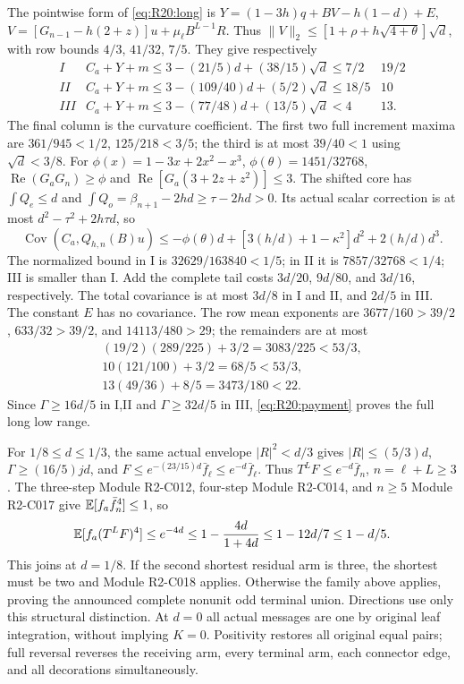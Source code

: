 The pointwise form of \eqref{eq:R20:long} is
$Y=(1-3h)q+BV-h(1-d)+E$,
$V=[G_{n-1}-h(2+z)]u+\mu_\ell B^{L-1}R$.
Thus $\|V\|_2\le[1+\rho+h\sqrt{4+\theta}]\sqrt d$, with row
bounds $4/3$, $41/32$, $7/5$. They give respectively
\[
\begin{array}{c|l|c}
I&C_a+Y+m\le3-(21/5)d+(38/15)\sqrt d\le7/2&19/2\\
II&C_a+Y+m\le3-(109/40)d+(5/2)\sqrt d\le18/5&10\\
III&C_a+Y+m\le3-(77/48)d+(13/5)\sqrt d<4&13.
\end{array}
\]
The final column is the curvature coefficient. The first two full
increment maxima are $361/945<1/2$, $125/218<3/5$; the third is
at most $39/40<1$ using $\sqrt d<3/8$.
For $\phi(x)=1-3x+2x^2-x^3$,
$\phi(\theta)=1451/32768$,
$\operatorname{Re}(G_aG_n)\ge\phi$ and
$\operatorname{Re}[G_a(3+2z+z^2)]\le3$.
The shifted core has $\int Q_e\le d$ and
$\int Q_o=\beta_{n+1}-2hd\ge\tau-2hd>0$.
Its actual scalar correction is at most $d^2-\tau^2+2h\tau d$,
so
\[
\operatorname{Cov}(C_a,Q_{h,n}(B)u)
\le-\phi(\theta)d+[3(h/d)+1-\kappa^2]d^2+2(h/d)d^3.
\]
The normalized bound in I is $32629/163840<1/5$;
in II it is $7857/32768<1/4$; III is smaller than I.
Add the complete tail costs $3d/20$, $9d/80$, and $3d/16$,
respectively. The total covariance is at most $3d/8$ in I and II,
and $2d/5$ in III. The constant $E$ has no covariance.
The row mean exponents are $3677/160>39/2$, $633/32>39/2$,
and $14113/480>29$; the remainders are at most
\[
\begin{gathered}
(19/2)(289/225)+3/2=3083/225<53/3,\\
10(121/100)+3/2=68/5<53/3,\\
13(49/36)+8/5=3473/180<22.
\end{gathered}
\]
Since $\Gamma\ge16d/5$ in I,II and $\Gamma\ge32d/5$ in III,
\eqref{eq:R20:payment} proves the full long low range.

For $1/8\le d\le1/3$, the same actual envelope $|R|^2<d/3$ gives
$|R|\le(5/3)d$, $\Gamma\ge(16/5)jd$, and
$F\le e^{-(23/15)d}\bar f_\ell\le e^{-d}\bar f_\ell$.
Thus $T^LF\le e^{-d}\bar f_n$, $n=\ell+L\ge3$.
The three-step Module R2-C012, four-step Module R2-C014,
and $n\ge5$ Module R2-C017 give $\mathbb E[f_a\bar f_n^4]\le1$, so
\[
\mathbb E[f_a(T^LF)^4]\le e^{-4d}\le1-\frac{4d}{1+4d}
\le1-12d/7\le1-d/5.
\]
This joins at $d=1/8$. If the second shortest residual arm is three,
the shortest must be two and Module R2-C018 applies. Otherwise the
family above applies, proving the announced complete nonunit odd
terminal union. Directions use only this structural distinction.
At $d=0$ all actual messages are one by original leaf integration,
without implying $K=0$. Positivity restores all original equal pairs;
full reversal reverses the receiving arm, every terminal arm, each
connector edge, and all decorations simultaneously.
